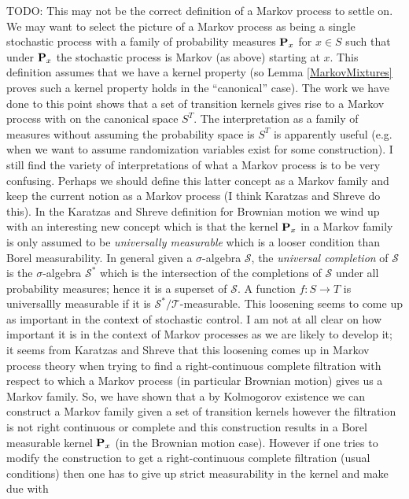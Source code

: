 TODO:  This may not be the correct definition of a Markov process to
settle on.   We may want to select the picture of a Markov process as
being a single stochastic process with a family of probability
measures $\textbf{P}_x$ for $x \in S$ such that under $\textbf{P}_x$ the
stochastic process is Markov (as above) starting at $x$.  This
definition assumes that we have a kernel property (so Lemma
\ref{MarkovMixtures} proves such a kernel property
holds in the ``canonical'' case).  The work we have done to this point
shows that a set of transition kernels gives rise to a Markov process
with on the canonical space $S^T$.  The interpretation as a family of measures
without assuming the probability space is $S^T$ is apparently useful (e.g. when we want to
assume randomization variables exist for some construction).  I still find the variety of
interpretations of what a Markov process is to be very confusing.
Perhaps we should define this latter concept as a Markov family and
keep the current notion as a Markov process (I think Karatzas and
Shreve do this).  In the Karatzas and Shreve definition for Brownian motion we wind up
with an interesting new concept which is that the kernel
$\textbf{P}_x$ in a Markov family is only assumed to be \emph{universally measurable}
which is a looser condition than Borel measurability.  In general given a $\sigma$-algebra $\mathcal{S}$, the \emph{universal completion} of $\mathcal{S}$ is the
$\sigma$-algebra $\mathcal{S}^*$ which is the intersection of the completions of $\mathcal{S}$ under all probability measures; hence it is a
superset of $\mathcal{S}$.  A function $f : S \to T$ is universallly measurable if it is $\mathcal{S}^*/\mathcal{T}$-measurable.  This loosening
seems to come up as important in the context of stochastic control.  I
am not at all clear on how important it is in the context of Markov
processes as we are likely to develop it; it seems from Karatzas and
Shreve that this loosening comes up in Markov process theory when
trying to find a right-continuous complete filtration with respect to which a
Markov process (in particular Brownian motion) gives us a Markov
family.  So, we have shown that a by Kolmogorov existence we can
construct a Markov family given a set of transition kernels however
the filtration is not right continuous or complete and this
construction results in a Borel measurable kernel $\textbf{P}_x$ (in the Brownian motion case).
However if one tries to modify the construction to get a
right-continuous complete filtration (usual conditions) then one has
to give up strict measurability in the kernel and make due with
